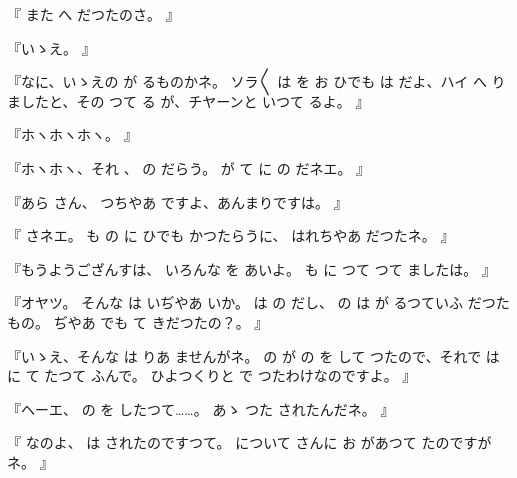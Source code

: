 『
また
へ
だつたのさ。
』

『いゝえ。
』

『なに、いゝえの
が
るものかネ。
ソラ〳〵
は
を
お
ひでも
は
だよ、ハイ
へ
りましたと、その
つて
る
が、チヤーンと
いつて
るよ。
』

『ホヽホヽホヽ。
』

『ホヽホヽ、それ
、
の
だらう。
が
て
に
の
だネエ。
』

『あら
さん、
つちやあ
ですよ、あんまりですは。
』

『
さネエ。
も
の
に
ひでも
かつたらうに、
はれちやあ
だつたネ。
』

『もうようござんすは、
いろんな
を
あいよ。
も
に
つて
つて
ましたは。
』

『オヤツ。
そんな
は
いぢやあ
いか。
は
の
だし、
の
は
が
るつていふ
だつたもの。
ぢやあ
でも
て
きだつたの？。
』

『いゝえ、そんな
は
りあ
ませんがネ。
の
が
の
を
して
つたので、それで
は
に
て
たつて
ふんで。
ひよつくりと
で
つたわけなのですよ。
』

『ヘーエ、
の
を
したつて……。
あゝ
つた
されたんだネ。
』

『
なのよ、
は
されたのですつて。
について
さんに
お
があつて
たのですがネ。
』

